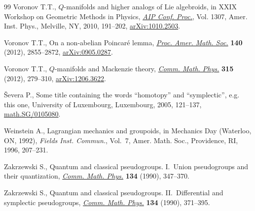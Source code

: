 \begin{thebibliography}{99}
Voronov T.T., {$Q$}-manifolds and higher analogs of {L}ie algebroids, in X{XIX}
 {W}orkshop on {G}eometric {M}ethods in {P}hysics, \href{https://doi.org/10.1063/1.3527417}{\textit{AIP Conf. Proc.}},
 Vol. 1307, Amer. Inst. Phys., Melville, NY, 2010, 191--202,
 \href{https://arxiv.org/abs/1010.2503}{arXiv:1010.2503}.

Voronov T.T., On a non-abelian {P}oincar\'{e} lemma, \href{https://doi.org/10.1090/S0002-9939-2011-11116-X}{\textit{Proc. Amer. Math.
 Soc.}} \textbf{140} (2012), 2855--2872, \href{https://arxiv.org/abs/0905.0287}{arXiv:0905.0287}.

Voronov T.T., {$Q$}-manifolds and {M}ackenzie theory, \href{https://doi.org/10.1007/s00220-012-1568-y}{\textit{Comm. Math.
 Phys.}} \textbf{315} (2012), 279--310, \href{https://arxiv.org/abs/1206.3622}{arXiv:1206.3622}.

\v{S}evera P., Some title containing the words ``homotopy'' and ``symplectic'',
 e.g. this one, University of Luxembourg, Luxembourg, 2005, 121--137,
 \href{https://arxiv.org/abs/math.SG/0105080}{math.SG/0105080}.

Weinstein A., Lagrangian mechanics and groupoids, in Mechanics Day ({W}aterloo,
 {ON}, 1992), \textit{Fields Inst. Commun.}, Vol.~7, Amer. Math. Soc.,
 Providence, RI, 1996, 207--231.

Zakrzewski S., Quantum and classical pseudogroups. {I}.~{U}nion pseudogroups
 and their quantization, \href{https://doi.org/10.1007/BF02097706}{\textit{Comm. Math. Phys.}} \textbf{134} (1990),
 347--370.

Zakrzewski S., Quantum and classical pseudogroups. {II}.~{D}ifferential and
 symplectic pseudogroups, \href{https://doi.org/10.1007/BF02097707}{\textit{Comm. Math. Phys.}} \textbf{134} (1990),
 371--395.

\end{thebibliography}
